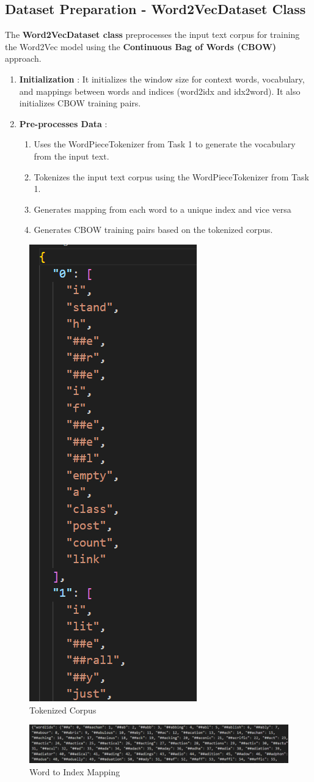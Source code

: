 \documentclass{article}
\begin{document}
\subsection{Dataset Preparation - Word2VecDataset Class}
The \textbf{Word2VecDataset class} preprocesses the input text corpus  for training the Word2Vec model using the \textbf{Continuous Bag of Words (CBOW)} approach.

\begin{enumerate}
\item \textbf{Initialization} : It initializes the window size for context words, vocabulary, and mappings between words and indices (word2idx and idx2word). It also initializes CBOW training pairs.

\item \textbf{Pre-processes Data} : 
    \begin{enumerate}
        \item Uses the WordPieceTokenizer from Task 1 to generate the vocabulary from the input text.
        \item Tokenizes the input text corpus using the WordPieceTokenizer from Task 1.
        \item Generates mapping from each word to a unique index and vice versa
        \item Generates CBOW training pairs based on the tokenized corpus.
    \end{enumerate}
    
\end{enumerate}

\begin{figure}[H]
    \centering
    \includegraphics[width=0.18\linewidth]{image7.png}
    \caption{Tokenized Corpus}
    \label{fig:enter-task1}
\end{figure}
\begin{figure}[H]
    \centering
    \includegraphics[width=1\linewidth]{image8.png} %
    \caption{Word to Index Mapping}
    \label{fig:enter-task1}
\end{figure}
\end{document}
